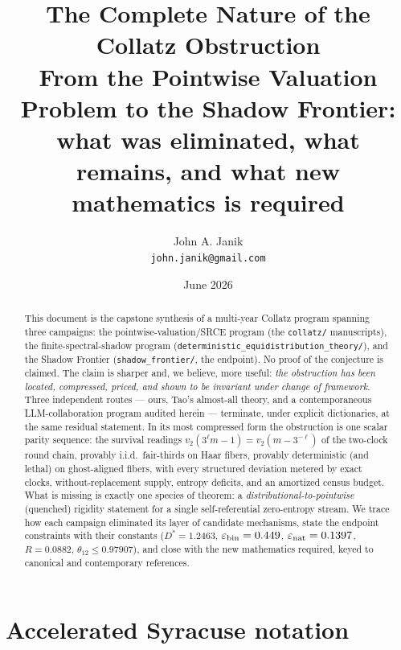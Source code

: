 \documentclass[11pt]{article}
\title{The Complete Nature of the Collatz Obstruction\\
\large From the Pointwise Valuation Problem to the Shadow Frontier:\\
what was eliminated, what remains, and what new mathematics is required}
\author{John A. Janik\\ \small\texttt{john.janik@gmail.com}}
\date{June 2026}
\newcommand{\vt}{v_2}
\begin{document}
\maketitle

\begin{abstract}
This document is the capstone synthesis of a multi-year Collatz program
spanning three campaigns: the pointwise-valuation/SRCE program (the
\texttt{collatz/} manuscripts), the finite-spectral-shadow program
(\texttt{deterministic\_equidistribution\_theory/}), and the Shadow
Frontier (\texttt{shadow\_frontier/}, the endpoint).  No proof of the
conjecture is claimed.  The claim is sharper and, we believe, more
useful: \emph{the obstruction has been located, compressed, priced, and
shown to be invariant under change of framework}.  Three independent
routes --- ours, Tao's almost-all theory, and a contemporaneous
LLM-collaboration program audited herein --- terminate, under explicit
dictionaries, at the same residual statement.  In its most compressed
form the obstruction is one scalar parity sequence: the survival
readings $\vt(3^\ell m-1)=\vt(m-3^{-\ell})$ of the two-clock round
chain, provably i.i.d.\ fair-thirds on Haar fibers, provably
deterministic (and lethal) on ghost-aligned fibers, with every
structured deviation metered by exact clocks, without-replacement
supply, entropy deficits, and an amortized census budget.  What is
missing is exactly one species of theorem: a
\emph{distributional-to-pointwise} (quenched) rigidity statement for a
single self-referential zero-entropy stream.  We trace how each
campaign eliminated its layer of candidate mechanisms, state the
endpoint constraints with their constants
($D^*=1.2463$, $\varepsilon_{\rm bin}=0.449$,
$\varepsilon_{\rm nat}=0.1397$, $R=0.0882$,
$\theta_{12}\le0.97907$), and close with the new mathematics required,
keyed to canonical and contemporary references.
\end{abstract}

\tableofcontents

\section{Accelerated Syracuse notation}
\end{document}
